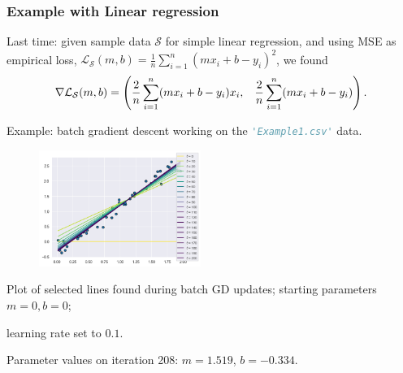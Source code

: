 \documentclass{beamer}
\theoremstyle{example}
\begin{document}
\begin{frame}
    \frametitle{Example with Linear regression}
    Last time: given sample data $\mathcal S$ for simple linear regression, and using MSE as empirical loss, $\mathcal L_{\mathcal S}(m,b) = \frac1n\sum_{i=1}^n(mx_i + b - y_i)^2$, we found 
        \[\nabla\mathcal L_{\mathcal S}(m,b) = 
        {\footnotesize
        \left( \frac{2}{n}\sum_{i=1}^n(mx_i + b - y_i)x_i, \quad \frac{2}{n}\sum_{i=1}^n(mx_i + b - y_i) \right).
        }
        \]
    
    Example: batch gradient descent working on the \lstinline[language=Python, stringstyle=\ttfamily\color{strings}]{'Example1.csv'} data.

    \begin{figure}
        \includegraphics[width=0.47\textwidth]{../../Images/GDonExampleData.png}
    \end{figure} 
    \phantom{line}\newline 
    \vfill
    Plot of selected lines found during batch GD updates; starting parameters $m=0, b=0$; 
    
    \pause
    learning rate set to $0.1$.
    
    Parameter values on iteration 208: $m=1.519$, $b=-0.334$.
    \vfill
    
\end{frame}
\end{document}
